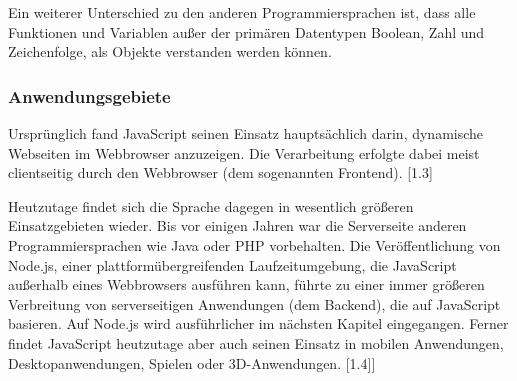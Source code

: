 Ein weiterer Unterschied zu den anderen Programmiersprachen ist, dass alle Funktionen und Variablen außer der primären Datentypen Boolean, Zahl und Zeichenfolge, als Objekte verstanden werden können.

\subsubsection{Anwendungsgebiete}
Ursprünglich fand JavaScript seinen Einsatz hauptsächlich darin, dynamische Webseiten im Web\-browser anzuzeigen. Die Verarbeitung erfolgte dabei meist clientseitig durch den Webbrowser (dem sogenannten Frontend). [1.3] 
\newline

Heutzutage findet sich die Sprache dagegen in wesentlich größeren Einsatzgebieten wieder. 
Bis vor einigen Jahren war die Serverseite anderen Programmiersprachen wie Java oder PHP vorbehalten. Die Veröffentlichung von Node.js, einer plattformübergreifenden Laufzeitumgebung, die JavaScript außerhalb eines Webbrowsers ausführen kann, führte zu einer immer größeren Verbreitung von serverseitigen Anwendungen (dem Backend), die auf JavaScript basieren. Auf Node.js wird ausführlicher im nächsten Kapitel eingegangen. 
Ferner findet JavaScript heutzutage aber auch seinen Einsatz in mobilen Anwendungen, Desktopanwendungen, Spielen oder 3D-Anwendungen. [1.4]]

